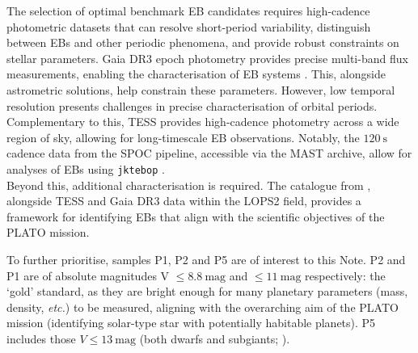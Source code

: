 The selection of optimal benchmark EB candidates requires high-cadence photometric datasets that can resolve short-period variability, distinguish between EBs and other periodic phenomena, and provide robust constraints on stellar parameters. Gaia DR3 epoch photometry provides precise multi-band flux measurements, enabling the characterisation of EB systems \citep{Gaia23}. This, alongside astrometric solutions, help constrain these parameters. However, low temporal resolution presents challenges in precise characterisation of orbital periods. Complementary to this, TESS provides high-cadence photometry across a wide region of sky, allowing for long-timescale EB observations. Notably, the $120\mathrm{\ s}$ cadence data from the SPOC pipeline, accessible via the MAST archive, allow for analyses of EBs using \verb|jktebop| \citep{Ricker14}.\\

Beyond this, additional characterisation is required. The catalogue from \citet{Prsa22}, alongside TESS and Gaia DR3 data within the LOPS2 field, provides a framework for identifying EBs that align with the scientific objectives of the PLATO mission. 

To further prioritise, samples P1, P2 and P5 are of interest to this Note. P2 and P1 are of absolute magnitudes V $\le 8.8 \mathrm{\ mag}$ and $\le 11 \mathrm{\ mag}$ respectively: the `gold' standard, as they are bright enough for many planetary parameters (mass, density, \textit{etc.}) to be measured, aligning with the overarching aim of the PLATO mission (identifying solar-type star with potentially habitable planets). P5 includes those $V \le 13 \mathrm{\ mag}$ (both dwarfs and subgiants; \citealp{ESA17}).

